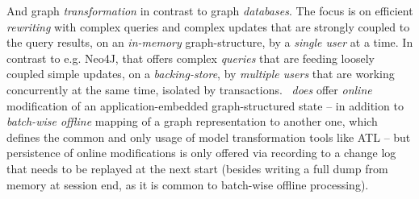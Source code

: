 \begin{description}
And graph \emph{transformation} in contrast to graph \emph{databases}.
The focus is on efficient \emph{rewriting} with complex queries and complex updates that are strongly coupled to the query results, 
on an \emph{in-memory} graph-structure, by a \emph{single user} at a time.
In contrast to e.g. Neo4J\cite{neo}, that offers complex \emph{queries} that are feeding loosely coupled simple updates,
on a \emph{backing-store}, by \emph{multiple users} that are working concurrently at the same time, isolated by transactions.
\GrG\ \emph{does} offer \emph{online} modification of an application-embedded graph-structured state
-- in addition to \emph{batch-wise offline} mapping of a graph representation to another one, which defines the common and only usage of model transformation tools like ATL\cite{atl} --
but persistence of online modifications is only offered via recording to a change log that needs to be replayed at the next start
(besides writing a full dump from memory at session end, as it is common to batch-wise offline processing).
\end{description}
